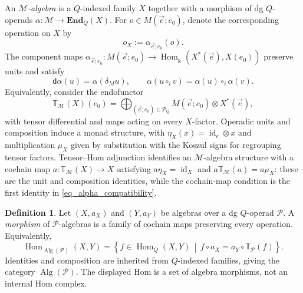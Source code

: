 \documentclass[11pt,letterpaper]{article}
\numberwithin{equation}{section}
\theoremstyle{plain}
\theoremstyle{definition}
\newtheorem{defn}[thm]{Definition}
\theoremstyle{remark}
\newcommand{\Hom}{\operatorname{Hom}}
\newcommand{\id}{\operatorname{id}}
\begin{document}
\medskip


An \textit{$\mathscr M$-algebra} is a $Q$-indexed family $X$ together
with a morphism of dg $Q$-operads
$\alpha:\mathscr M\to\mathbf{End}_Q(X)$.
For $o\in M(\vec e;e_0)$, denote the corresponding operation on $X$ by
\begin{equation}\label{eq_algebra_operation_notation}
 o_X:=\alpha_{\vec e;e_0}(o).
\end{equation}
The component maps
$
 \alpha_{\vec e;e_0}:M(\vec e;e_0)
 \to\underline{\operatorname{Hom}}_{\Bbbk}
       (X^*(\vec e),X(e_0))
$
preserve units and satisfy
\begin{equation}\label{eq_alpha_compatibility}
 \mathsf d\alpha(u)=\alpha(\delta_Mu),
 \qquad
 \alpha(u\circ_i v)=\alpha(u)\circ_i\alpha(v).
\end{equation}
Equivalently, consider the endofunctor
\begin{equation*} \mathbb T_{\mathscr M}(X)(e_0)
 =\bigoplus_{(\vec e;e_0)\in\mathcal P_Q}
     M(\vec e;e_0)\otimes X^*(\vec e),
\end{equation*}
with tensor differential and maps acting on every $X$-factor.
Operadic units and composition induce a monad structure, with
$\eta_X(x)=\id_e\otimes x$ and multiplication $\mu_X$ given by
substitution with the Koszul signs for regrouping tensor factors.
Tensor--Hom adjunction identifies an $\mathscr M$-algebra structure
with a cochain map $a:\mathbb T_{\mathscr M}(X)\to X$ satisfying
$a\eta_X=\id_X$ and $a\mathbb T_{\mathscr M}(a)=a\mu_X$:
these are the unit and composition identities, while the cochain-map
condition is the first identity in \eqref{eq_alpha_compatibility}.

\begin{defn}\label{defn_quiver_operad_algebra_morphisms}
Let $(X,a_X)$ and $(Y,a_Y)$ be algebras over a dg $Q$-operad
$\mathscr P$. A \textit{morphism} of $\mathscr P$-algebras
is a family of cochain maps preserving every operation. Equivalently,
\begin{equation}\label{eq_quiver_operad_algebra_morphisms}
 \operatorname{Hom}_{\operatorname{Alg}(\mathscr P)}(X,Y)
 =\left\{f\in\Hom_Q(X,Y)\,\middle|\,
 f\circ a_X=a_Y\circ\mathbb T_{\mathscr P}(f)\right\}.
\end{equation}
Identities and composition are inherited from $Q$-indexed families,
giving the category $\operatorname{Alg}(\mathscr P)$. The displayed
Hom is a set of algebra morphisms, not an internal Hom complex.
\end{defn}
\end{document}

